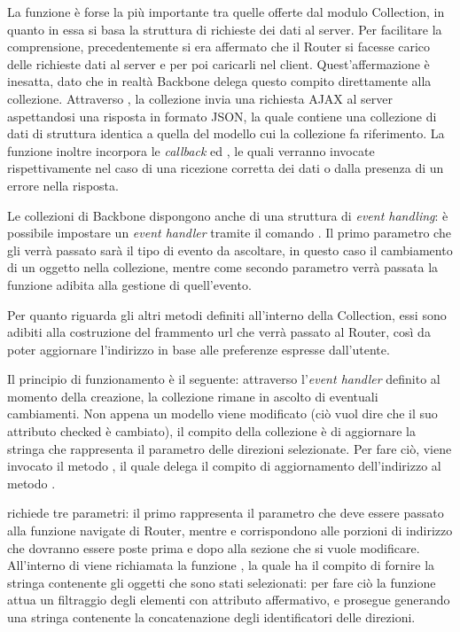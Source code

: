 La funzione  è forse la più importante tra quelle offerte dal modulo Collection, in quanto in essa si basa la struttura di richieste dei dati al server. Per facilitare la comprensione, precedentemente si era affermato che il Router si facesse carico delle richieste dati al server e per poi caricarli nel client. Quest'affermazione è inesatta, dato che in realtà Backbone delega questo compito direttamente alla collezione. Attraverso , la collezione invia una richiesta AJAX al server aspettandosi una risposta in formato JSON, la quale contiene una collezione di dati di struttura identica a quella del modello cui la collezione fa riferimento.
La funzione  inoltre incorpora le {\itshape callback}  ed , le quali verranno invocate rispettivamente nel caso di una ricezione corretta dei dati o dalla presenza di un errore nella risposta.

Le collezioni di Backbone dispongono anche di una struttura di {\itshape event handling}: è possibile impostare un {\itshape event handler} tramite il comando . Il primo parametro che gli verrà passato sarà il tipo di evento da ascoltare, in questo caso il cambiamento di un oggetto nella collezione, mentre come secondo parametro verrà passata la funzione adibita alla gestione di quell'evento.

Per quanto riguarda gli altri metodi definiti all'interno della Collection, essi sono adibiti alla costruzione del frammento url che verrà passato al Router, così da poter aggiornare l'indirizzo in base alle preferenze espresse dall'utente.

Il principio di funzionamento è il seguente: attraverso l'{\itshape event handler} definito al momento della creazione, la collezione rimane in ascolto di eventuali cambiamenti. Non appena un modello viene modificato (ciò vuol dire che il suo attributo checked è cambiato), il compito della collezione è di aggiornare la stringa che rappresenta il parametro delle direzioni selezionate. Per fare ciò, viene invocato il metodo , il quale delega il compito di aggiornamento dell'indirizzo al metodo .

  richiede tre parametri: il primo rappresenta il parametro  che deve essere passato alla funzione navigate di Router, mentre  e  corrispondono alle porzioni di indirizzo che dovranno essere poste prima e dopo alla sezione che si vuole modificare.
 All'interno di  viene richiamata la funzione , la quale ha il compito di fornire la stringa contenente gli oggetti che sono stati selezionati: per fare ciò la funzione attua un filtraggio degli elementi con attributo  affermativo, e prosegue generando una stringa contenente la concatenazione degli identificatori delle direzioni.

